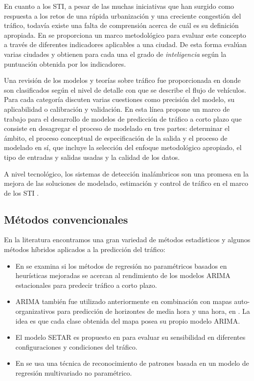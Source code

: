 \documentclass{llncs}
\begin{document}
En cuanto a los STI, a pesar de las muchas iniciativas que han surgido como respuesta a los retos de una rápida urbanización y una creciente congestión del tráfico, todavía existe una falta de comprensión acerca de cuál es su definición apropiada. En \cite{Debnath201447} se proporciona un marco metodológico para evaluar este concepto a través de diferentes indicadores aplicables a una ciudad. De esta forma evalúan varias ciudades y obtienen para cada una el grado de \emph{inteligencia} según la puntuación obtenida por los indicadores.

Una revisión de los modelos y teorías sobre tráfico fue proporcionada en \cite{Hoogendoorn2001283} donde son clasificados según el nivel de detalle con que se describe el flujo de vehículos. Para cada categoría discuten varias cuestiones como precisión del modelo, su aplicabilidad o calibración y validación.  En esta línea \cite{Vlahogianni2004533} propone un marco de trabajo para el desarrollo de modelos de predicción de tráfico a corto plazo que consiste en desagregar el proceso de modelado en tres partes: determinar el ámbito, el proceso conceptual de especificación de la salida y el proceso de modelado en sí, que incluye la selección del enfoque metodológico apropiado, el tipo de entradas y salidas usadas y la calidad de los datos.

A nivel tecnológico, los sistemas de detección inalámbricos son una promesa en la mejora de las soluciones de modelado, estimación y control de tráfico en el marco de los STI \cite{tubaishat2009wireless}. 



\subsection{Métodos convencionales}
En la literatura encontramos una gran variedad de métodos estadísticos y algunos métodos híbridos aplicados a la predicción del tráfico:
\begin{itemize}
\item En \cite{smith2002comparison} se examina si los métodos de regresión no paramétricos basados en heurísticas mejoradas se acercan al rendimiento de los modelos ARIMA estacionales para predecir tráfico a corto plazo.
\item ARIMA también fue utilizado anteriormente en combinación con mapas auto-organizativos para predicción de horizontes de media hora y una hora, en \cite{van1996combining}. La idea es que cada clase obtenida del mapa posea su propio modelo ARIMA. 
\item El modelo SETAR es propuesto en \cite{ishak2002performance} para evaluar su sensibilidad en diferentes configuraciones y condiciones del tráfico.
\item En \cite{clark2003traffic} se usa una técnica de reconocimiento de patrones basada en un modelo de regresión multivariado no paramétrico.
\end{itemize}
\end{document}
